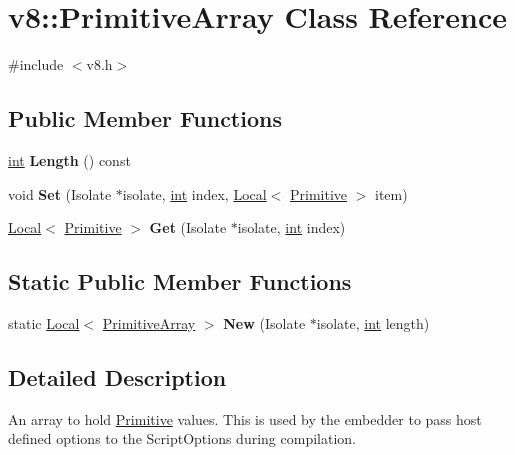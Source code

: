 \hypertarget{classv8_1_1PrimitiveArray}{}\section{v8\+:\+:Primitive\+Array Class Reference}
\label{classv8_1_1PrimitiveArray}


{\ttfamily \#include $<$v8.\+h$>$}

\subsection*{Public Member Functions}
\begin{DoxyCompactItemize}
\item 
\mbox{\label{classv8_1_1PrimitiveArray_a7e51b026e03b0a4ab3c3bec4676dfd9e}} 
\mbox{\hyperlink{classint}{int}} {\bfseries Length} () const
\item 
\mbox{\label{classv8_1_1PrimitiveArray_af857e95d15c32fdab2e48b8e202a7dfb}} 
void {\bfseries Set} (Isolate $\ast$isolate, \mbox{\hyperlink{classint}{int}} index, \mbox{\hyperlink{classv8_1_1Local}{Local}}$<$ \mbox{\hyperlink{classv8_1_1Primitive}{Primitive}} $>$ item)
\item 
\mbox{\label{classv8_1_1PrimitiveArray_a2733121dacd5aa13b5cb278231a0bb1f}} 
\mbox{\hyperlink{classv8_1_1Local}{Local}}$<$ \mbox{\hyperlink{classv8_1_1Primitive}{Primitive}} $>$ {\bfseries Get} (Isolate $\ast$isolate, \mbox{\hyperlink{classint}{int}} index)
\end{DoxyCompactItemize}
\subsection*{Static Public Member Functions}
\begin{DoxyCompactItemize}
\item 
\mbox{\label{classv8_1_1PrimitiveArray_a71af2d7e5be17432a02b6fffc7a8f1a1}} 
static \mbox{\hyperlink{classv8_1_1Local}{Local}}$<$ \mbox{\hyperlink{classv8_1_1PrimitiveArray}{Primitive\+Array}} $>$ {\bfseries New} (Isolate $\ast$isolate, \mbox{\hyperlink{classint}{int}} length)
\end{DoxyCompactItemize}


\subsection{Detailed Description}
An array to hold \mbox{\hyperlink{classv8_1_1Primitive}{Primitive}} values. This is used by the embedder to pass host defined options to the Script\+Options during compilation.

